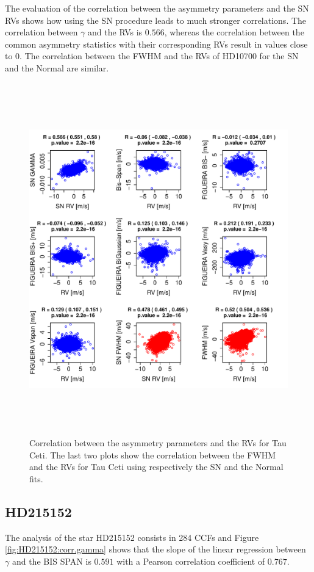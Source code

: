\documentclass[11pt, oneside]{article}
\begin{document}
The evaluation of the correlation between the asymmetry parameters and the SN RVs shows how using the SN procedure leads to much stronger correlations. The correlation between $\gamma$ and the RVs is $0.566$, whereas the correlation between the common asymmetry statistics with their corresponding RVs result in values close to $0$. The correlation between the FWHM and the RVs of HD10700 for the SN and the Normal are similar. 
%
\begin{figure}[htbp]
   \centering
\includegraphics[height = 6in]{HD10700_[4]Comparison_para.pdf}  
   \caption{Correlation between the asymmetry parameters and the RVs for Tau Ceti. The last two plots show the correlation between the FWHM and the RVs for Tau Ceti using respectively the SN and the Normal fits.}
   \label{fig:Tau:corrPlot}
\end{figure}

\subsection{HD215152}  \label{sec:HD215152}

The analysis of the star HD215152 consists in 284 CCFs and Figure \ref{fig:HD215152:corr.gamma} shows that the slope of the linear regression between $\gamma$ and the BIS SPAN is $0.591$ with a Pearson correlation coefficient of $0.767$.
\end{document}

